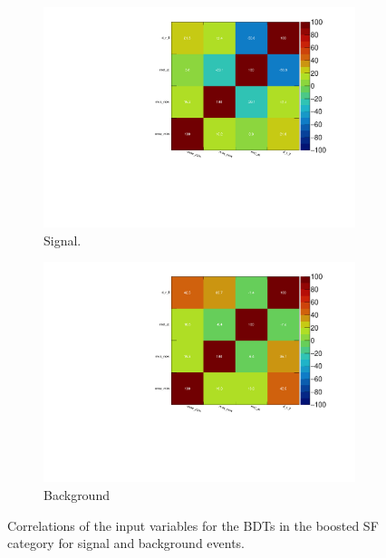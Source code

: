 \begin{figure}[htb]
    \centering
    \begin{subfigure}[t]{0.7\textwidth}
        \includegraphics[width=\textwidth]{./plots/mva/variable_reduction/BOOST_SF_CorrelationMatrixS.pdf}
        \caption{Signal.}
    \end{subfigure}
    \begin{subfigure}[t]{0.7\textwidth}
        \includegraphics[width=\textwidth]{./plots/mva/variable_reduction/BOOST_SF_CorrelationMatrixB.pdf}
        \caption{Background}
    \end{subfigure}
    \caption{Correlations of the input variables for the BDTs in the boosted SF category for signal and background events.}\label{fig:mva:variables:correlationsb:boostsf}
\end{figure}\begin{figure}[htb]

\end{figure}
